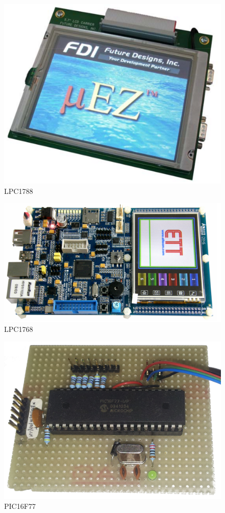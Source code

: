 \documentclass[a4paper,titlepage]{book}
\begin{document}
\begin{figure}[!h]
\centering
\includegraphics[scale=1]{lpc1788.png}
\caption{LPC1788}
\end{figure}


\begin{figure}[!h]
\centering
\includegraphics[scale=1]{lpc1768.png}
\caption{LPC1768}
\end{figure}


\begin{figure}[!h]
\centering
\includegraphics[scale=0.15]{pic16f77.png}
\caption{PIC16F77}
\end{figure}
\end{document}
